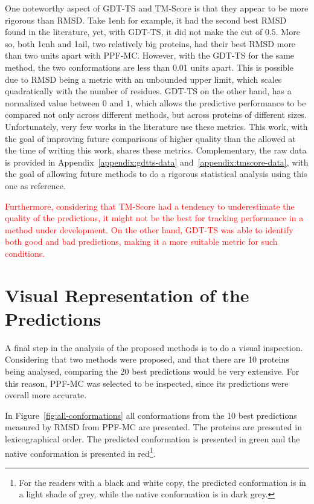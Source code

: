 One noteworthy aspect of GDT-TS and TM-Score is that they appear to be more
rigorous than RMSD. Take 1enh for example, it had the second best RMSD found
in the literature, yet, with GDT-TS, it did not make the cut of $0.5$. More so,
both 1enh and 1ail, two relatively big proteins, had their best RMSD more
than two units apart with PPF-MC. However, with the GDT-TS for the same
method, the two conformations are less than $0.01$ units apart. This is possible
due to RMSD being a metric with an unbounded upper limit, which scales
quadratically with the number of residues. GDT-TS on the other hand, has a
normalized value between $0$ and $1$, which allows the predictive performance
to be compared not only across different methods, but across proteins of different sizes.
Unfortunately, very few works in the literature use these metrics. This work,
with the goal of improving future comparisons of higher quality than the allowed
at the time of writing this work, shares these metrics. Complementary, the raw data is
provided in Appendix~\ref{appendix:gdtts-data} and~\ref{appendix:tmscore-data},
with the goal of allowing future methods to do a rigorous statistical analysis
using this one as reference.

\textcolor{red}{
Furthermore, considering that TM-Score had a tendency to underestimate the quality
of the predictions, it might not be the best for tracking performance in a
method under development. On the other hand, GDT-TS was able to identify both
good and bad predictions, making it a more suitable metric for such conditions.
}

\section{Visual Representation of the Predictions}
\label{sec:visual-analysis}

A final step in the analysis of the proposed methods is to do a visual
inspection. Considering that two methods were proposed, and that there are 10
proteins being analysed, comparing the 20 best predictions would be very
extensive. For this reason, PPF-MC was selected to be inspected, since
its predictions were overall more accurate.



In Figure~\ref{fig:all-conformations} all conformations from the 10 best
predictions measured by RMSD from PPF-MC are presented. The proteins are presented in
lexicographical order. The predicted conformation is presented in green and the
native conformation is presented in red\footnote{For the readers with a black
and white copy, the predicted conformation is in a light shade of grey, while
the native conformation is in dark grey.}.

